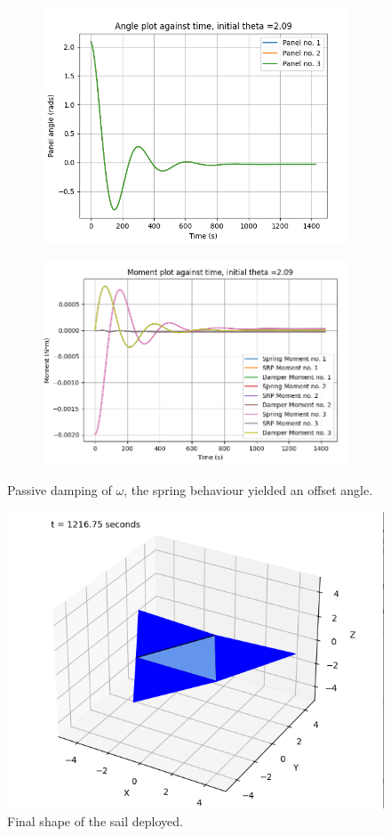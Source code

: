 \begin{figure}[!htb]
\centering
\begin{subfigure}{0.3\textwidth}
  \centering
  \includegraphics[width=1\linewidth]{images/third/angleconcentric pyramid.png}
\end{subfigure}%
\begin{subfigure}{.5\textwidth}
  \centering
  \includegraphics[width=1\linewidth]{images/third/momentconcentric pyramid.png}
\end{subfigure}
\caption{Passive damping of $\omega$, the spring behaviour yielded an offset angle.}
\label{pyramidsim}
\end{figure}

\begin{figure}[H]
\centering
  \includegraphics[width=0.5\linewidth]{images/third/concentrictriangular.png}
\caption{Final shape of the sail deployed.}
\label{concentricsaildeployed}
\end{figure}

